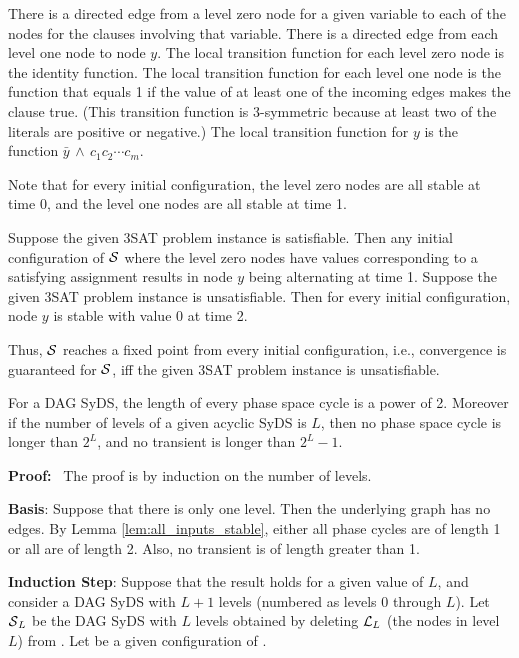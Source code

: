 There is a directed edge from a  level zero node for a given variable 
to each of  the nodes for the clauses involving that variable.
There is a directed edge from each level one node to node $y$.
The local transition function for each level zero node is the identity function.
The local transition function for each level one node is the function that equals 1
 if the value of at least one of the incoming edges
makes the clause true. 
(This transition function is 3-symmetric because at least two of the literals are positive or negative.)
The local transition function for $y$ is the function $\bar{y} \, \wedge \, c_1 c_2 \cdots  c_{m}$.

Note that for every initial configuration, the level zero nodes are all stable at time 0,
and the level one nodes are all stable at time 1.

\smallskip
Suppose the given 3SAT problem instance is satisfiable.
Then any initial configuration of $\mbox{$\mathcal{S}$}$ where the level zero nodes 
have values corresponding to a satisfying assignment
results in node $y$ being alternating at time 1.
Suppose the given 3SAT problem instance is unsatisfiable.
Then for every initial configuration, node $y$ is stable with value 0 at time 2.

\smallskip
Thus, $\mbox{$\mathcal{S}$}$ reaches a fixed point from every initial configuration, 
i.e.,  convergence is guaranteed for $\mbox{$\mathcal{S}$}$,
iff the given 3SAT problem instance is unsatisfiable.
\QED

\begin{theorem}\label{thm:levels_phase_space}
For a DAG SyDS,
the length of every phase space cycle is a power of 2.
Moreover if the number of levels of a given acyclic SyDS is $L$,
then no phase space cycle is longer than $2^L$,
and no transient is longer than $2^L-1$.
\end{theorem}

\noindent
\textbf{Proof:}~ 
The proof is by induction on the number of levels.

{\bf Basis}: Suppose that there is only one level.
Then the underlying  graph has no edges.
By Lemma \ref{lem:all_inputs_stable},
either all phase cycles are of length 1 or all are of length 2. 
Also, no transient is of length greater than 1.

{\bf Induction Step}: Suppose that the result holds for a given value of $L$,
and consider a DAG SyDS \cals{} with $L+1$ levels (numbered as levels 0 through $L$).
Let $\mbox{$\mathcal{S}$}_L$ be the DAG SyDS with $L$ levels obtained 
by deleting $\mbox{$\mathcal{L}$}_L$ (the nodes in level $L$) from \cals{}.
Let \calc{} be a given configuration of \cals{}.

